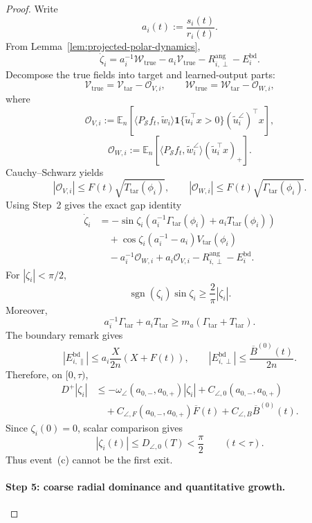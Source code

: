 \documentclass{article} %
\theoremstyle{plain}
\theoremstyle{definition}
\theoremstyle{remark}
\begin{document}
\begin{proof}
Write
\[
a_i(t):=\frac{s_i(t)}{r_i(t)}.
\]
From Lemma~\ref{lem:projected-polar-dynamics},
\[
\dot\zeta_i
=
a_i^{-1}\mathcal W_{\mathrm{true}}
-
a_i\mathcal V_{\mathrm{true}}
-
R_{i,\perp}^{\mathrm{ang}}
-
E_i^{\mathrm{bd}}.
\]
Decompose the true fields into target and learned-output parts:
\[
\mathcal V_{\mathrm{true}}
=
\mathcal V_{\mathrm{tar}}-\mathcal O_{V,i},
\qquad
\mathcal W_{\mathrm{true}}
=
\mathcal W_{\mathrm{tar}}-\mathcal O_{W,i},
\]
where
\[
\mathcal O_{V,i}
:=
\mathbb E_n
\left[
\langle P_{\mathcal S}f_t,\widetilde w_i\rangle
\mathbf 1\{\widetilde u_i^\top x>0\}
(\widetilde u_i^\angle)^\top x
\right],
\]
\[
\mathcal O_{W,i}
:=
\mathbb E_n
\left[
\langle P_{\mathcal S}f_t,\widetilde w_i^\angle\rangle
(\widetilde u_i^\top x)_+
\right].
\]
Cauchy--Schwarz yields
\[
|\mathcal O_{V,i}|
\le
F(t)\sqrt{T_{\mathrm{tar}}(\phi_i)},
\qquad
|\mathcal O_{W,i}|
\le
F(t)\sqrt{\Gamma_{\mathrm{tar}}(\phi_i)}.
\]
Using Step~2 gives the exact gap identity
\[
\boxed{
\begin{aligned}
\dot\zeta_i
&=
-\sin\zeta_i
\left(
a_i^{-1}\Gamma_{\mathrm{tar}}(\phi_i)
+
a_iT_{\mathrm{tar}}(\phi_i)
\right)
\\
&\quad+
\cos\zeta_i
\left(
a_i^{-1}-a_i
\right)V_{\mathrm{tar}}(\phi_i)
\\
&\quad-
a_i^{-1}\mathcal O_{W,i}
+
a_i\mathcal O_{V,i}
-
R_{i,\perp}^{\mathrm{ang}}
-
E_i^{\mathrm{bd}}.
\end{aligned}
}
\]
For $|\zeta_i|<\pi/2$,
\[
\operatorname{sgn}(\zeta_i)\sin\zeta_i
\ge
\frac2\pi|\zeta_i|.
\]
Moreover,
\[
a_i^{-1}\Gamma_{\mathrm{tar}}
+
a_iT_{\mathrm{tar}}
\ge
m_a
(\Gamma_{\mathrm{tar}}+T_{\mathrm{tar}}).
\]
The boundary remark gives
\[
|E_{i,\parallel}^{\mathrm{bd}}|
\le
a_i\frac{X}{2n}(X+F(t)),
\qquad
|E_{i,\perp}^{\mathrm{bd}}|
\le
\frac{\overline B^{(0)}(t)}{2n}.
\]
Therefore, on $[0,\tau)$,
\[
\begin{aligned}
D^+|\zeta_i|
&\le
-\omega_\angle(a_{0,-},a_{0,+})|\zeta_i|
+
C_{\angle,0}(a_{0,-},a_{0,+})
\\
&\quad+
C_{\angle,F}(a_{0,-},a_{0,+})\overline F(t)
+
C_{\angle,B}\overline B^{(0)}(t).
\end{aligned}
\]
Since $\zeta_i(0)=0$, scalar comparison gives
\[
|\zeta_i(t)|
\le
D_{\angle,0}(T)
<
\frac\pi2
\qquad
(t<\tau).
\]
Thus event~\textnormal{(c)} cannot be the first exit.

\paragraph{Step 5: coarse radial dominance and quantitative growth.}


\end{proof}
\end{document}
